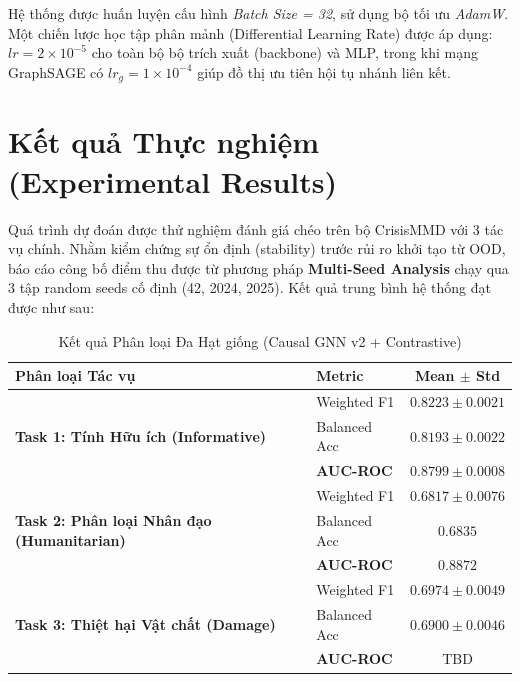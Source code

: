 \documentclass[11pt,a4paper]{article}
\begin{document}
Hệ thống được huấn luyện cấu hình \textit{Batch Size = 32}, sử dụng bộ tối ưu \textit{AdamW}. Một chiến lược học tập phân mảnh (Differential Learning Rate) được áp dụng: $lr=2\times10^{-5}$ cho toàn bộ bộ trích xuất (backbone) và MLP, trong khi mạng GraphSAGE có $lr_g=1\times10^{-4}$ giúp đồ thị ưu tiên hội tụ nhánh liên kết.

\section{Kết quả Thực nghiệm (Experimental Results)}

Quá trình dự đoán được thử nghiệm đánh giá chéo trên bộ CrisisMMD với 3 tác vụ chính. Nhằm kiểm chứng sự ổn định (stability) trước rủi ro khởi tạo từ OOD, báo cáo công bố điểm thu được từ phương pháp \textbf{Multi-Seed Analysis} chạy qua 3 tập random seeds cố định (42, 2024, 2025). Kết quả trung bình hệ thống đạt được như sau:

\begin{table}[H]
    \centering
    \caption{Kết quả Phân loại Đa Hạt giống (Causal GNN v2 + Contrastive)}
    \begin{tabular}{llc}
        \toprule
        \textbf{Phân loại Tác vụ} & \textbf{Metric} & \textbf{Mean $\pm$ Std} \\
        \midrule
        \multirow{3}{*}{\textbf{Task 1: Tính Hữu ích (Informative)}} & Weighted F1 & $0.8223 \pm 0.0021$ \\
                                                                    & Balanced Acc & $0.8193 \pm 0.0022$ \\
                                                                    & \textbf{AUC-ROC} & $0.8799 \pm 0.0008$ \\
        \midrule
        \multirow{3}{*}{\textbf{Task 2: Phân loại Nhân đạo (Humanitarian)}}& Weighted F1 & $0.6817 \pm 0.0076$ \\
                                                                    & Balanced Acc & $0.6835$ \\
                                                                    & \textbf{AUC-ROC} & $0.8872$ \\
        \midrule
        \multirow{3}{*}{\textbf{Task 3: Thiệt hại Vật chất (Damage)}}    & Weighted F1 & $0.6974 \pm 0.0049$ \\
                                                                    & Balanced Acc & $0.6900 \pm 0.0046$ \\
                                                                    & \textbf{AUC-ROC} & TBD \\
        \bottomrule
    \end{tabular}
\end{table}
\end{document}

